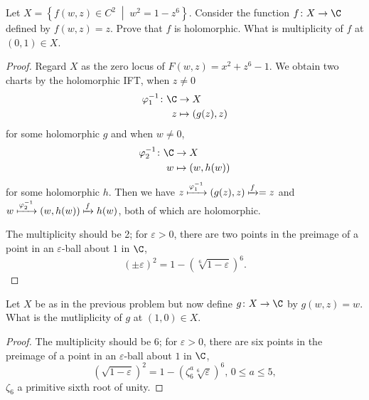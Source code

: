\documentclass[10pt]{amsart}
\begin{document}
\begin{thm}
  Let $X = \left\{f(w, z) \in C^2 \;\middle\vert\; w^2 = 1 - z^6\right\}$.
  Consider the function $f \colon X \rightarrow \C$ defined by $f(w, z) = z$.
  Prove that $f$ is holomorphic. 
  What is multiplicity of $f$ at $(0, 1) \in X$.

  \begin{proof}
    Regard $X$ as the zero locus of $F(w,z) = x^2 + z^6 - 1$.
    We obtain two charts by the holomorphic IFT, when $z \neq 0$ 
    \begin{align*}
      \varphi_1^{-1} \colon \C &\rightarrow X\\
      z &\mapsto (g(z), z)
    \end{align*}
    for some holomorphic $g$ and when $w \neq 0$, 
    \begin{align*}
      \varphi_2^{-1} \colon \C &\rightarrow X\\
      w &\mapsto (w, h(w))
      \end{align*}
    for some holomorphic $h$.
    Then we have $z \xmapsto{\varphi_1^{-1}} (g(z), z) \xmapsto{f} = z$ and $w \xmapsto{\varphi_2^{-1}} (w, h(w)) \xmapsto{f} h(w)$, both of which are holomorphic.
    
    The multiplicity should be 2; for $\varepsilon > 0$, there are two points in the preimage of a point in an $\varepsilon$-ball about $1$ in $\C$,
    $$(\pm \varepsilon)^2 = 1 - (\sqrt[6]{1 - \varepsilon})^6.$$
  \end{proof}
\end{thm}

\begin{thm}
  Let $X$ be as in the previous problem but now define $g \colon X \rightarrow \C$ by $g(w,z) = w$.
  What is the mutliplicity of $g$ at $(1,0) \in X$.
  
  \begin{proof}
    The multiplicity should be 6; for $\varepsilon > 0$, there are six points in the preimage of a point in an $\varepsilon$-ball about $1$ in $\C$,
    $$(\sqrt{1 - \varepsilon})^2 = 1 - (\zeta_6^a\sqrt[6]{\varepsilon})^6,\, 0 \leq a \leq 5,$$
    $\zeta_6$ a primitive sixth root of unity.
  \end{proof}
\end{thm}
\end{document}
